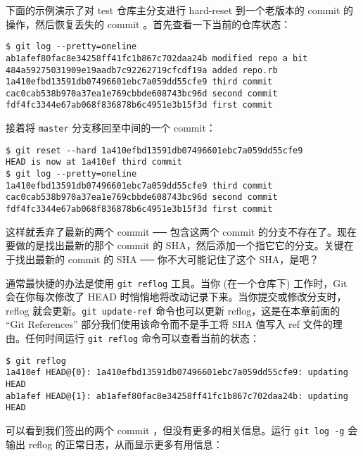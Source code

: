 \documentclass[a4paper]{book}
\begin{document}
下面的示例演示了对 test 仓库主分支进行 hard-reset 到一个老版本的 commit 的操作，然后恢复丢失的 commit 。首先查看一下当前的仓库状态：

\begin{shaded}\begin{verbatim}
$ git log --pretty=oneline
ab1afef80fac8e34258ff41fc1b867c702daa24b modified repo a bit
484a59275031909e19aadb7c92262719cfcdf19a added repo.rb
1a410efbd13591db07496601ebc7a059dd55cfe9 third commit
cac0cab538b970a37ea1e769cbbde608743bc96d second commit
fdf4fc3344e67ab068f836878b6c4951e3b15f3d first commit
\end{verbatim}\end{shaded}

接着将 \texttt{master} 分支移回至中间的一个 commit：

\begin{shaded}\begin{verbatim}
$ git reset --hard 1a410efbd13591db07496601ebc7a059dd55cfe9
HEAD is now at 1a410ef third commit
$ git log --pretty=oneline
1a410efbd13591db07496601ebc7a059dd55cfe9 third commit
cac0cab538b970a37ea1e769cbbde608743bc96d second commit
fdf4fc3344e67ab068f836878b6c4951e3b15f3d first commit
\end{verbatim}\end{shaded}

这样就丢弃了最新的两个 commit ── 包含这两个 commit 的分支不存在了。现在要做的是找出最新的那个 commit 的 SHA，然后添加一个指它它的分支。关键在于找出最新的 commit 的 SHA ── 你不大可能记住了这个 SHA，是吧？

通常最快捷的办法是使用 \texttt{git reflog} 工具。当你 (在一个仓库下) 工作时，Git 会在你每次修改了 HEAD 时悄悄地将改动记录下来。当你提交或修改分支时，reflog 就会更新。\texttt{git update-ref} 命令也可以更新 reflog，这是在本章前面的 “Git References” 部分我们使用该命令而不是手工将 SHA 值写入 ref 文件的理由。任何时间运行 \texttt{git reflog} 命令可以查看当前的状态：

\begin{shaded}\begin{verbatim}
$ git reflog
1a410ef HEAD@{0}: 1a410efbd13591db07496601ebc7a059dd55cfe9: updating HEAD
ab1afef HEAD@{1}: ab1afef80fac8e34258ff41fc1b867c702daa24b: updating HEAD
\end{verbatim}\end{shaded}

可以看到我们签出的两个 commit ，但没有更多的相关信息。运行 \texttt{git log -g} 会输出 reflog 的正常日志，从而显示更多有用信息：
\end{document}
